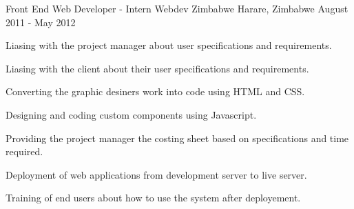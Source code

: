 \begin{cventries}

\cventry
{Front End Web Developer - Intern} %
{Webdev Zimbabwe} %
{Harare, Zimbabwe} %
{August 2011 - May 2012} %
{
  \begin{cvitems} %
    \item {Liasing with the project manager about user specifications and requirements.}   
    \item {Liasing with the client about their user specifications and requirements.}
    \item {Converting the graphic desiners work into code using HTML and CSS.}
    \item {Designing and coding custom components using Javascript.}
    \item {Providing the project manager the costing sheet based on specifications and time required.}
    \item {Deployment of web applications from development server to live server.}
    \item {Training of end users about how to use the system after deployement.}
  \end{cvitems}
}

\end{cventries}
